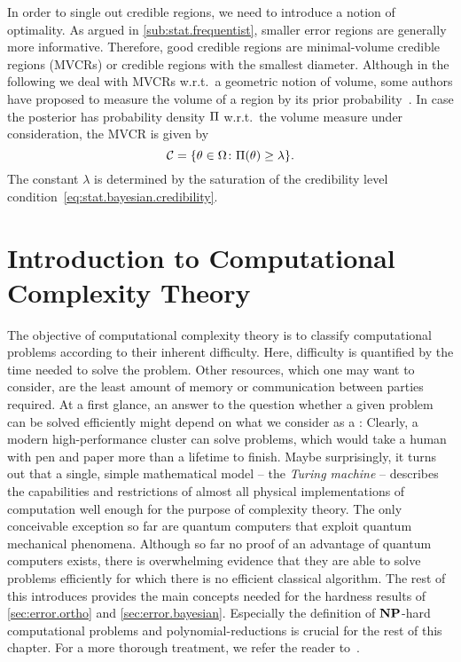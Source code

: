 In order to single out  credible regions, we need to introduce a notion of optimality.
As argued in \cref{sub:stat.frequentist}, smaller error regions are generally more informative.
Therefore, good credible regions are minimal-volume credible regions (MVCRs) or credible regions with the smallest diameter.
Although in the following we deal with MVCRs w.r.t.\ a geometric notion of volume, some authors have proposed to measure the volume of a region by its prior probability~\cite{Evans_2006_Optimally,Shang_2013_Optimal}.
In case the posterior has probability density $\Pi$ w.r.t.\ the volume measure under consideration, the MVCR is given by
\[
  \label{eq:stat.bayesian.mvcr}
  \mathcal{C} = \{ \theta \in \Omega\colon \Pi(\theta) \ge \lambda \}.
\]
The constant $\lambda$ is determined by the saturation of the credibility level condition~\eqref{eq:stat.bayesian.credibility}.




\section{Introduction to Computational Complexity Theory}
\label{sec:error.complexity}


The objective of computational complexity theory is to classify computational problems according to their inherent difficulty.
Here, difficulty is quantified by the time needed to solve the problem.
Other resources, which one may want to consider, are the least amount of memory or communication between parties required.
At a first glance, an answer to the question whether a given problem can be solved efficiently might depend on what we consider as a :
Clearly, a modern high-performance cluster can solve problems, which would take a human with pen and paper more than a lifetime to finish.
Maybe surprisingly, it turns out that a single, simple mathematical model -- the \emph{Turing machine} -- describes the capabilities and restrictions of almost all physical implementations of computation well enough for the purpose of complexity theory.
The only conceivable exception so far are quantum computers that exploit quantum mechanical phenomena.
Although so far no proof of an advantage of quantum computers exists, there is overwhelming evidence that they are able to solve problems efficiently for which there is no efficient classical algorithm.
The rest of this introduces provides the main concepts needed for the hardness results of \cref{sec:error.ortho} and \ref{sec:error.bayesian}.
Especially the definition of $\mathbf{NP}$-hard computational problems and polynomial-reductions is crucial for the rest of this chapter.
For a more thorough treatment, we refer the reader to~\cite{Arora_2009_Computational,Garey_2002_Computers}.

